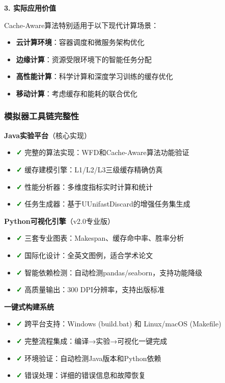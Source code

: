 \textbf{3. 实际应用价值}

Cache-Aware算法特别适用于以下现代计算场景：
\begin{itemize}
    \item \textbf{云计算环境}：容器调度和微服务架构优化
    \item \textbf{边缘计算}：资源受限环境下的智能任务分配
    \item \textbf{高性能计算}：科学计算和深度学习训练的缓存优化
    \item \textbf{移动计算}：考虑缓存和能耗的联合优化
\end{itemize}

\subsubsection{模拟器工具链完整性}

\textbf{Java实验平台}（核心实现）
\begin{itemize}
    \item \textcolor{green}{\textbf{✓}} 完整的算法实现：WFD和Cache-Aware算法功能验证
    \item \textcolor{green}{\textbf{✓}} 缓存建模引擎：L1/L2/L3三级缓存精确仿真
    \item \textcolor{green}{\textbf{✓}} 性能分析器：多维度指标实时计算和统计
    \item \textcolor{green}{\textbf{✓}} 任务生成器：基于UUnifastDiscard的增强任务集生成
\end{itemize}

\textbf{Python可视化引擎}（v2.0专业版）
\begin{itemize}
    \item \textcolor{green}{\textbf{✓}} 三套专业图表：Makespan、缓存命中率、胜率分析
    \item \textcolor{green}{\textbf{✓}} 国际化设计：全英文图例，适合学术论文
    \item \textcolor{green}{\textbf{✓}} 智能依赖检测：自动检测pandas/seaborn，支持功能降级
    \item \textcolor{green}{\textbf{✓}} 高质量输出：300 DPI分辨率，支持出版标准
\end{itemize}

\textbf{一键式构建系统}
\begin{itemize}
    \item \textcolor{green}{\textbf{✓}} 跨平台支持：Windows (build.bat) 和 Linux/macOS (Makefile)
    \item \textcolor{green}{\textbf{✓}} 完整流程集成：编译→实验→可视化一键完成
    \item \textcolor{green}{\textbf{✓}} 环境验证：自动检测Java版本和Python依赖
    \item \textcolor{green}{\textbf{✓}} 错误处理：详细的错误信息和故障恢复
\end{itemize}

